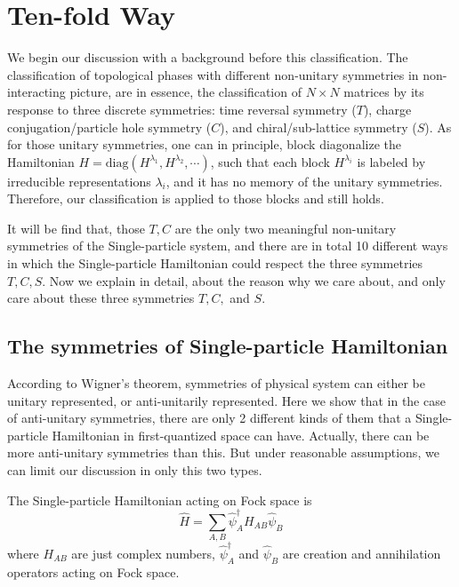 \documentclass{article}
\begin{document}
\section{Ten-fold Way}

We begin our discussion with a background before this classification.  The
classification of topological phases with different non-unitary symmetries in
non-interacting picture, are in essence, the classification of $N\times N$
matrices by its response to three discrete symmetries: time reversal symmetry
($T$), charge conjugation/particle hole symmetry ($C$), and chiral/sub-lattice
symmetry ($S$). As for those unitary symmetries, one can in principle, block
diagonalize the Hamiltonian
$H=\mathrm{diag}(H^{\lambda_1},H^{\lambda_2},\cdots)$, such that each block
$H^{\lambda_i}$ is labeled by irreducible representations $\lambda_i$, and it
has no memory of the unitary symmetries. Therefore, our classification is
applied to those blocks and still holds.

It will be find that, those $T,C$ are the only two meaningful non-unitary
symmetries of the Single-particle system, and there are in total 10 different
ways in which the Single-particle Hamiltonian could respect the three symmetries
$T,C,S$. Now we explain in detail, about the reason why we care about, and only
care about these three symmetries $T,C,$ and $S$.

\subsection{The symmetries of Single-particle Hamiltonian}
\label{sec:The symmetries of Single-particle Hamiltonian}

According to Wigner's theorem, symmetries of physical system can either be
unitary represented, or anti-unitarily represented. Here we show that in the
case of anti-unitary symmetries, there are only 2 different kinds of them that a
Single-particle Hamiltonian in first-quantized space can have. Actually, there
can be more anti-unitary symmetries than this. But under reasonable assumptions,
we can limit our discussion in only this two types.

The Single-particle Hamiltonian acting on Fock space is
\begin{equation}
    \label{eq:H-2nd}
    \hat{H} = \sum_{A,B} \hat\psi^\dagger_A H_{AB} \hat\psi_{B}
\end{equation}
where $H_{AB}$ are just complex numbers, $\hat\psi^\dagger_A$ and $\hat\psi_B$
are creation and annihilation operators acting on Fock space.
\end{document}

